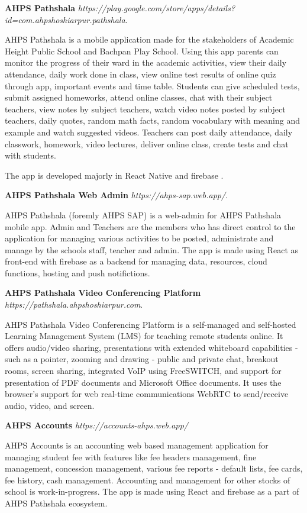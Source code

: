\documentclass[margin,line]{res}
\begin{document}
\begin{resume}
\textbf{AHPS Pathshala} {\em https://play.google.com/store/apps/details?id=com.ahpshoshiarpur.pathshala}. 

AHPS Pathshala is a mobile application made for the stakeholders of Academic Height Public School and Bachpan Play School. Using this app parents can monitor the progress of their ward in the academic activities, view their daily attendance, daily work done in class, view online test results of online quiz through app, important events and time table. Students can give scheduled tests, submit assigned homeworks, attend online classes, chat with their subject teachers, view notes by subject teachers, watch video notes posted by subject teachers, daily quotes, random math facts, random vocabulary with meaning and example and watch suggested videos. Teachers can post daily attendance, daily classwork, homework, video lectures, deliver online class, create tests and chat with students. 

The app is developed majorly in React Native and firebase .

\textbf{AHPS Pathshala Web Admin} {\em https://ahps-sap.web.app/}.

AHPS Pathshala (foremly AHPS SAP) is a web-admin for AHPS Pathshala mobile app. Admin and Teachers are the members who has direct control to the application for managing various activities to be posted, administrate and manage by the schools staff, teacher and admin. The app is made using React as front-end with firebase as a backend for managing data, resources, cloud functions, hosting and push notifictions.

\textbf{AHPS Pathshala Video Conferencing Platform} {\em https://pathshala.ahpshoshiarpur.com}.

AHPS Pathshala Video Conferencing Platform is a self-managed and self-hosted Learning Management System (LMS) for teaching remote students online.  It offers audio/video sharing, presentations with extended whiteboard capabilities - such as a pointer, zooming and drawing - public and private chat, breakout rooms, screen sharing, integrated VoIP using FreeSWITCH, and support for presentation of PDF documents and Microsoft Office documents. It uses the browser's support for web real-time communications WebRTC to send/receive audio, video, and screen. 

\textbf{AHPS Accounts} {\em https://accounts-ahps.web.app/}

AHPS Accounts is an accounting web based management application for managing student fee with features like fee headers management, fine management, concession management, various fee reports - default lists, fee cards, fee history, cash management. Accounting and management for other stocks of school is work-in-progress. The app is made using React and firebase as a part of AHPS Pathshala ecosystem.


\end{resume}
\end{document}
